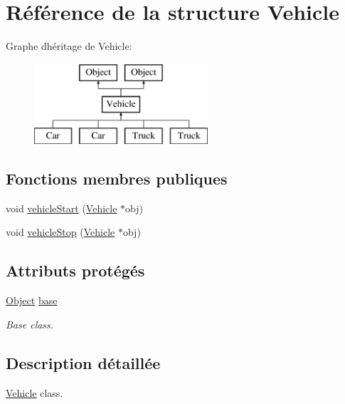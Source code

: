 \hypertarget{struct_vehicle}{}\section{Référence de la structure Vehicle}
\label{struct_vehicle}
Graphe d\textquotesingle{}héritage de Vehicle\+:\begin{figure}[H]
\begin{center}
\leavevmode
\includegraphics[height=3.000000cm]{struct_vehicle}
\end{center}
\end{figure}
\subsection*{Fonctions membres publiques}
\begin{DoxyCompactItemize}
\item 
void \hyperlink{struct_vehicle_a6891d3d28853bc3fdd075596dc6de9f8}{vehicle\+Start} (\hyperlink{struct_vehicle}{Vehicle} $\ast$obj)
\item 
void \hyperlink{struct_vehicle_a4dcbcba43792dcd673a552b14479ab77}{vehicle\+Stop} (\hyperlink{struct_vehicle}{Vehicle} $\ast$obj)
\end{DoxyCompactItemize}
\subsection*{Attributs protégés}
\begin{DoxyCompactItemize}
\item 
\hyperlink{struct_object}{Object} \hyperlink{struct_vehicle_ad7970f528d429f6fc1725173e93a77c2}{base}
\begin{DoxyCompactList}\small\item\em Base class. \end{DoxyCompactList}\end{DoxyCompactItemize}


\subsection{Description détaillée}
\hyperlink{struct_vehicle}{Vehicle} class. 

